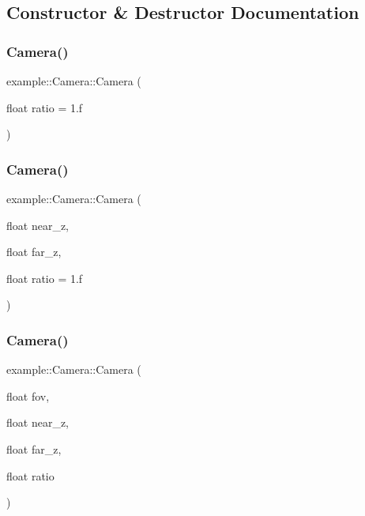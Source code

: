 \subsection{Constructor \& Destructor Documentation}
\mbox{\label{classexample_1_1_camera_af7baaae5fda716b71356ce0d36cb5856}} 
\subsubsection{Camera()\hspace{0.1cm}{\footnotesize\ttfamily [1/3]}}
{\footnotesize\ttfamily example\+::\+Camera\+::\+Camera (\begin{DoxyParamCaption}\item[{float}]{ratio = {\ttfamily 1.f} }\end{DoxyParamCaption})\hspace{0.3cm}{\ttfamily [inline]}}

\mbox{\label{classexample_1_1_camera_ae9996fd414d9ea3b212d10fc736d08e4}} 
\subsubsection{Camera()\hspace{0.1cm}{\footnotesize\ttfamily [2/3]}}
{\footnotesize\ttfamily example\+::\+Camera\+::\+Camera (\begin{DoxyParamCaption}\item[{float}]{near\+\_\+z,  }\item[{float}]{far\+\_\+z,  }\item[{float}]{ratio = {\ttfamily 1.f} }\end{DoxyParamCaption})\hspace{0.3cm}{\ttfamily [inline]}}

\mbox{\label{classexample_1_1_camera_af7f8bfa29635307a57c5abe94225a3c6}} 
\subsubsection{Camera()\hspace{0.1cm}{\footnotesize\ttfamily [3/3]}}
{\footnotesize\ttfamily example\+::\+Camera\+::\+Camera (\begin{DoxyParamCaption}\item[{float}]{fov,  }\item[{float}]{near\+\_\+z,  }\item[{float}]{far\+\_\+z,  }\item[{float}]{ratio }\end{DoxyParamCaption})\hspace{0.3cm}{\ttfamily [inline]}}



